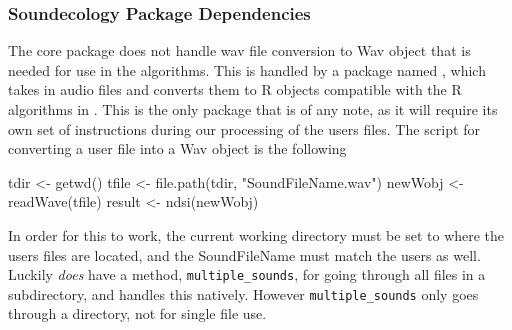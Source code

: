 \subsubsection{Soundecology Package Dependencies}
The core  package does not handle wav file conversion to Wav object that is needed for use in the algorithms. This is handled by a package named , which takes in audio files and converts them to R objects compatible with the R algorithms in . This is the only package that is of any note, as it will require its own set of instructions during our processing of the user\textquotesingle s files. The script for converting a user file into a Wav object is the following

\begin{javascriptcode}
  tdir <- getwd()
  tfile <- file.path(tdir, "SoundFileName.wav")
  newWobj <- readWave(tfile)
  result <- ndsi(newWobj)
\end{javascriptcode}

In order for this to work, the current working directory must be set to where the user\textquotesingle s files are located, and the SoundFileName must match the user\textquotesingle s as well. Luckily  \textit{does} have a method, \verb|multiple_sounds|, for going through all files in a subdirectory, and handles this natively. However \verb|multiple_sounds| only goes through a directory, not for single file use.
